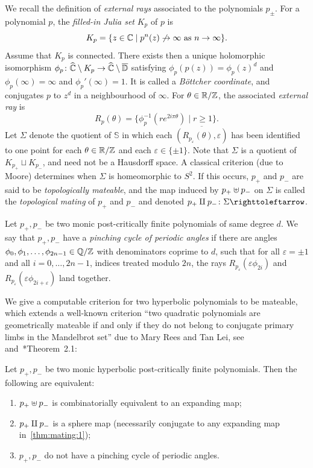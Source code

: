 \documentclass{amsart}
\begin{document}
We recall the definition of \emph{external rays} associated to the
polynomials $p_\pm$. For a polynomial $p$, the \emph{filled-in Julia
  set} $K_p$ of $p$ is
\[K_p=\{z\in{\mathbb C}\mid p^n(z)\not\to\infty\text{ as }n\to\infty\}.\]
Assume that $K_p$ is connected. There exists then a unique holomorphic
isomorphism
$\phi_p\colon{\widehat{{\mathbb C}}}\setminus K_p\to{\widehat{{\mathbb C}}}\setminus\overline{\mathbb D}$
satisfying $\phi_p(p(z))=\phi_p(z)^d$ and $\phi_p(\infty)=\infty$ and
$\phi_p'(\infty)=1$. It is called a \emph{B\"ottcher coordinate}, and
conjugates $p$ to $z^d$ in a neighbourhood of $\infty$. For
$\theta\in{\mathbb R}/{\mathbb Z}$, the associated \emph{external ray} is
\[R_p(\theta)=\{\phi_p^{-1}(re^{2i\pi\theta})\mid r\ge1\}.
\]
Let $\Sigma$ denote the quotient of $\mathbb S$ in which each
$\overline{(R_{p_\varepsilon}(\theta),\varepsilon)}$ has been
identified to one point for each $\theta\in{\mathbb R}/{\mathbb Z}$ and each
$\varepsilon\in\{\pm1\}$. Note that $\Sigma$ is a quotient of
$K_{p_+}\sqcup K_{p_-}$, and need not be a Hausdorff space. A
classical criterion (due to Moore) determines when $\Sigma$ is
homeomorphic to $S^2$. If this occurs, $p_+$ and $p_-$ are said to be
\emph{topologically mateable}, and the map induced by $p_+\uplus p_-$ on
$\Sigma$ is called the \emph{topological mating} of $p_+$ and
$p_-$ and denoted $p_+\GM p_-\colon \Sigma\selfmap$.

\begin{defn}
  Let $p_+,p_-$ be two monic post-critically finite polynomials of
  same degree $d$. We say that $p_+,p_-$ have a \emph{pinching cycle
    of periodic angles} if there are angles
  $\phi_0,\phi_1, \dots, \phi_{2n-1}\in {\mathbb Q}/{\mathbb Z}$ with denominators
  coprime to $d$, such that for all $\varepsilon=\pm1$ and all
  $i=0,\dots,2n-1$, indices treated modulo $2n$, the rays
  $R_{p_\varepsilon}( \varepsilon \phi_{2i})$ and
  $R_{p_\varepsilon}(\varepsilon \phi_{2i+\varepsilon})$ land
  together.
\end{defn}

We give a computable criterion for two hyperbolic polynomials to be
mateable, which extends a well-known criterion ``two quadratic
polynomials are geometrically mateable if and only if they do not
belong to conjugate primary limbs in the Mandelbrot set'' due to Mary
Rees and Tan Lei, see~\cite{tan:matings}
and~\cite{buff+:questionsaboutmatings}*{Theorem~2.1}:
\begin{mainthm}\label{thm:mating}
  Let $p_+,p_-$ be two monic hyperbolic post-critically finite polynomials. Then
  the following are equivalent:
  \begin{enumerate}
  \item\label{thm:mating:1} $p_+ \uplus p_-$ is combinatorially
    equivalent to an expanding map;
  \item\label{thm:mating:2} $p_+ \amalg p_-$ is a sphere map (necessarily
    conjugate to any expanding map in~\eqref{thm:mating:1});
  \item\label{thm:mating:3} $p_+,p_-$ do not have a pinching cycle of
    periodic angles.
  \end{enumerate}
\end{mainthm}
\end{document}
